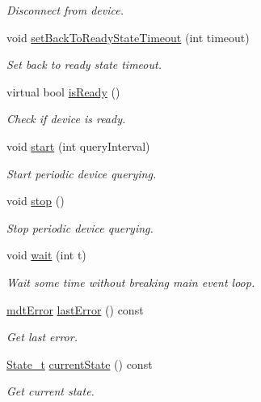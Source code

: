 \begin{DoxyCompactItemize}
\begin{DoxyCompactList}\small\item\em Disconnect from device. \end{DoxyCompactList}\item 
void \hyperlink{classmdt_device_aa241c40514683254990e742cf1bbb155}{set\-Back\-To\-Ready\-State\-Timeout} (int timeout)
\begin{DoxyCompactList}\small\item\em Set back to ready state timeout. \end{DoxyCompactList}\item 
virtual bool \hyperlink{classmdt_device_a326ca430ec756d5e1203f70b7be4b58e}{is\-Ready} ()
\begin{DoxyCompactList}\small\item\em Check if device is ready. \end{DoxyCompactList}\item 
void \hyperlink{classmdt_device_a721c5bf2cfa0eef5304333f08da182f7}{start} (int query\-Interval)
\begin{DoxyCompactList}\small\item\em Start periodic device querying. \end{DoxyCompactList}\item 
void \hyperlink{classmdt_device_adc7ff8f01d68506283a3d0cc6bc25407}{stop} ()
\begin{DoxyCompactList}\small\item\em Stop periodic device querying. \end{DoxyCompactList}\item 
void \hyperlink{classmdt_device_a0d6416888307cbfc5fcd7c22fc0039d7}{wait} (int t)
\begin{DoxyCompactList}\small\item\em Wait some time without breaking main event loop. \end{DoxyCompactList}\item 
\hyperlink{classmdt_error}{mdt\-Error} \hyperlink{classmdt_device_a79ca328ff9e9f413a38c1cc9c9267cee}{last\-Error} () const 
\begin{DoxyCompactList}\small\item\em Get last error. \end{DoxyCompactList}\item 
\hyperlink{classmdt_device_a8bcf508fbd38a8f0b235e8a9b00319f6}{State\-\_\-t} \hyperlink{classmdt_device_ad7fb4c3cafc87cba9eca588ad226f662}{current\-State} () const 
\begin{DoxyCompactList}\small\item\em Get current state. \end{DoxyCompactList}\end{DoxyCompactItemize}
